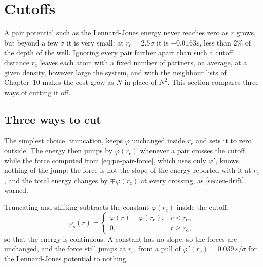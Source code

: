 \section{Cutoffs}
\label{sec:pe-cutoffs}

A pair potential such as the Lennard-Jones energy never reaches zero as
$r$ grows, but beyond a few $\sigma$ it is very small: at $r_{\mathrm c} = 2.5\sigma$
it is $-0.0163\varepsilon$, less than 2\% of the depth of the well.
Ignoring every pair farther apart than such a cutoff distance
$r_{\mathrm c}$ leaves each atom with a fixed number of partners, on
average, at a given density, however large the system, and with the neighbour lists of
Chapter~10 makes the cost grow as $N$ in place of $N^2$. This section
compares three ways of cutting it off.

\subsection*{Three ways to cut}

The simplest choice, truncation, keeps $\varphi$ unchanged inside
$r_{\mathrm c}$ and sets it to zero outside. The energy then jumps by
$\varphi(r_{\mathrm c})$ whenever a pair crosses the cutoff, while the
force computed from \cref{eq:pe-pair-force}, which uses only $\varphi'$,
knows nothing of the jump: the force is not the slope of the energy
reported with it at $r_{\mathrm c}$, and the total energy changes by
$\mp\varphi(r_{\mathrm c})$ at every crossing, as \cref{sec:en-drift}
warned.

Truncating and shifting subtracts the constant $\varphi(r_{\mathrm c})$
inside the cutoff,
\begin{equation*}
   \varphi_{\mathrm s}(r) = \begin{cases}
      \varphi(r) - \varphi(r_{\mathrm c}) , & r < r_{\mathrm c} ,\\
      0 , & r \ge r_{\mathrm c} ,
   \end{cases}
\end{equation*}
so that the energy is continuous. A constant has no slope, so the forces
are unchanged, and the force still jumps at $r_{\mathrm c}$, from a
pull of $\varphi'(r_{\mathrm c}) = 0.039\,\varepsilon/\sigma$ for the
Lennard-Jones potential to nothing.

